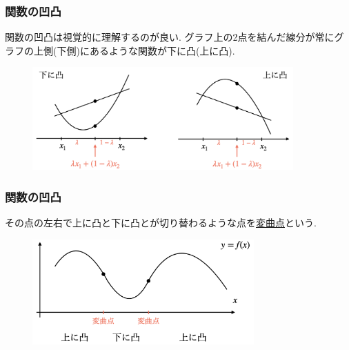 


\begin{frame}
\frametitle{関数の凹凸}


関数の凹凸は視覚的に理解するのが良い. 
グラフ上の2点を結んだ線分が常にグラフの上側(下側)にあるような関数が下に凸(上に凸).


 \begin{figure}[htbp]
 \begin{center} 
  \includegraphics[width=100mm]{calculus7/convex.png}
 \end{center}
\end{figure}


\end{frame}






\begin{frame}
\frametitle{関数の凹凸}


その点の左右で上に凸と下に凸とが切り替わるような点を\underline{変曲点}という.


 \begin{figure}[htbp]
 \begin{center} 
  \includegraphics[width=85mm]{calculus7/inflection.png}
 \end{center}
\end{figure}


\end{frame}


